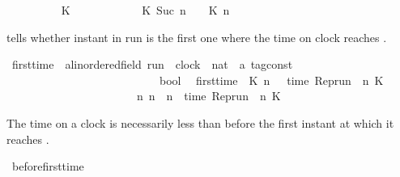 \begin{isabellebody}
\ \ {\isacharparenleft}{\isachardoublequoteopen}{\isacharhash}\isactrlsub {\isacharless}\ {\isacharunderscore}\ {\isacharunderscore}\ {\isacharunderscore}{\isachardoublequoteclose}{\isacharparenright}\isanewline
{}\isanewline
\ \ {\isacartoucheopen}{\isacharparenleft}{\isacharhash}\isactrlsub {\isacharless}\ {\isasymrho}\ K\ {}{\isacharparenright}\ \ \ \ \ \ \ {\isacharequal}\ {}{\isacartoucheclose}\isanewline
{\isacharbar}\ {\isacartoucheopen}{\isacharparenleft}{\isacharhash}\isactrlsub {\isacharless}\ {\isasymrho}\ K\ {\isacharparenleft}Suc\ n{\isacharparenright}{\isacharparenright}\ {\isacharequal}\ {\isacharhash}\isactrlsub {\isasymle}\ {\isasymrho}\ K\ n{\isacartoucheclose}%
\begin{isamarkuptext}%
 tells whether instant  in run \isa{{\isasymrho}}
  is the first one where the time on clock  reaches \isa{{\isasymtau}}.%
\end{isamarkuptext}\isamarkuptrue%
\isamarkupfalse%
\ first{\isacharunderscore}time\ {\isacharcolon}{\isacharcolon}\ {\isacartoucheopen}{\isacharprime}a{\isacharcolon}{\isacharcolon}linordered{\isacharunderscore}field\ run\ {\isasymRightarrow}\ clock\ {\isasymRightarrow}\ nat\ {\isasymRightarrow}\ {\isacharprime}a\ tag{\isacharunderscore}const\isanewline
\ \ \ \ \ \ \ \ \ \ \ \ \ \ \ \ \ \ \ \ \ \ \ \ \ \ {\isasymRightarrow}\ bool{\isacartoucheclose}\isanewline
{}\isanewline
\ \ {\isacartoucheopen}first{\isacharunderscore}time\ {\isasymrho}\ K\ n\ {\isasymtau}\ {\isasymequiv}\ {\isacharparenleft}time\ {\isacharparenleft}{\isacharparenleft}Rep{\isacharunderscore}run\ {\isasymrho}{\isacharparenright}\ n\ K{\isacharparenright}\ {\isacharequal}\ {\isasymtau}{\isacharparenright}\isanewline
\ \ \ \ \ \ \ \ \ \ \ \ \ \ \ \ \ \ \ \ \ \ {\isasymand}\ {\isacharparenleft}{\isasymnexists}n{\isacharprime}{\isachardot}\ n{\isacharprime}\ {\isacharless}\ n\ {\isasymand}\ time\ {\isacharparenleft}{\isacharparenleft}Rep{\isacharunderscore}run\ {\isasymrho}{\isacharparenright}\ n{\isacharprime}\ K{\isacharparenright}\ {\isacharequal}\ {\isasymtau}{\isacharparenright}{\isacartoucheclose}%
\begin{isamarkuptext}%
The time on a clock is necessarily less than \isa{{\isasymtau}} before the first instant
  at which it reaches \isa{{\isasymtau}}.%
\end{isamarkuptext}\isamarkuptrue%
\isamarkupfalse%
\ before{\isacharunderscore}first{\isacharunderscore}time{\isacharcolon}\isanewline

\end{isabellebody}
